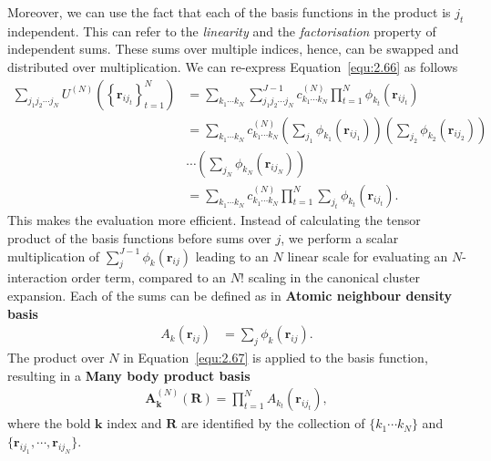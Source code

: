 Moreover, we can use the fact that each of the basis functions in the product is $j_{t}$ independent. 
This can refer to the \textit{linearity} and the \textit{factorisation} property of independent sums.
These sums over multiple indices, hence, can be swapped and distributed over multiplication.
We can re-express Equation~\eqref{equ:2.66} as follows
\begin{equation}
\label{equ:2.67}
\begin{split}
\sum_{{j}_{1}{j}_{2}\cdots{j}_{N}}U^{(N)}(\left\{\mathbf{r}_{ij_{t}}\right\}_{t=1}^{N})
&=\sum_{{k}_{1}\cdots{k}_{N}}\sum^{J-1}_{{j}_{1}{j}_{2}\cdots{j}_{N}}
c^{(N)}_{{k}_{1}\cdots{k}_{N}}\prod_{t=1}^{N}\phi_{k_{t}}(\mathbf{r}_{i{j}_{t}})\\ 
&=\sum_{{k}_{1}\cdots{k}_{N}}
c^{(N)}_{{k}_{1}\cdots{k}_{N}}
\left(
\sum_{{j}_{1}}\phi_{k_{1}}(\mathbf{r}_{i{j}_{1}})
\right)
\left(
\sum_{{j}_{2}}\phi_{k_{2}}(\mathbf{r}_{i{j}_{2}})
\right)\\ 
&
\cdots
\left(
\sum_{{j}_{N}}\phi_{k_{N}}(\mathbf{r}_{i{j}_{N}})
\right)\\ 
&=\sum_{{k}_{1}\cdots{k}_{N}}
c^{(N)}_{{k}_{1}\cdots{k}_{N}}\prod_{t=1}^{N}\sum_{{j}_{t}}\phi_{k_{t}}(\mathbf{r}_{i{j}_{t}}).
\end{split}
\end{equation}
This makes the evaluation more efficient.
Instead of calculating the tensor product of the basis functions before sums over $j$, we perform a scalar multiplication of $\sum^{J-1}_{j}\phi_{k}(\mathbf{r}_{ij})$ leading to an $N$ linear scale for evaluating an $N$-interaction order term, compared to an $N!$ scaling in the canonical cluster expansion. Each of the sums can be defined as in \textbf{Atomic neighbour density basis}   
\begin{equation}
\label{equ:2.68}
\begin{split}
A_{k}(\mathbf{r}_{ij})&=\sum_{j}\phi_{k}(\mathbf{r}_{ij}).
\end{split}
\end{equation}
The product over $N$ in Equation~\eqref{equ:2.67} is applied to the basis function, resulting in a \textbf{Many body product basis} 
\begin{equation}
\label{equ:2.69}
\begin{split}
\textbf{A}^{(N)}_{\mathbf{k}}(\mathbf{R})=\prod_{t=1}^{N}A_{k_{t}}(\mathbf{r}_{ij_{t}}),
\end{split}
\end{equation}
where the bold $\textbf{k}$ index and $\mathbf{R}$ are identified by the collection of $\{{k}_{1}\cdots{k}_{N}\}$ and $\{\mathbf{r}_{ij_{1}},\cdots,\mathbf{r}_{ij_{N}}\}$.
